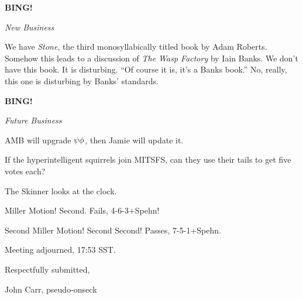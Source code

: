 \documentclass[12pt]{article}
\newcommand{\bing}{{\bf BING!} }
\newcommand{\goto}[1]{\bing \vskip 12pt \centerline{{\em{#1}}}}
\begin{document}
\goto{New Business}

We have {\em Stone}, the third monosyllabically titled book by Adam
Roberts.  Somehow this leads to a discussion of {\em The Wasp Factory}
by Iain Banks.  We don't have this book.  It is disturbing.  ``Of
course it is, it's a Banks book.''  No, really, this one is
disturbing by Banks' standards.

\vspace{12pt}

\goto{Future Business}

AMB will upgrade $\rm \psi\phi$, then Jamie will update it.

If the hyperintelligent squirrels join MITSFS, can they use their
tails to get five votes each?

The Skinner looks at the clock.

Miller Motion!  Second.  Fails, \hbox{4-6-3+Spehn}!

Second Miller Motion!  Second Second!  Passes, \hbox{7-5-1+Spehn}.

\vspace{12pt}

\noindent
Meeting adjourned, 17:53 SST.

\vspace{18pt}

\centerline{Respectfully submitted,}
\centerline{John Carr, pseudo-onseck}
\end{document}
